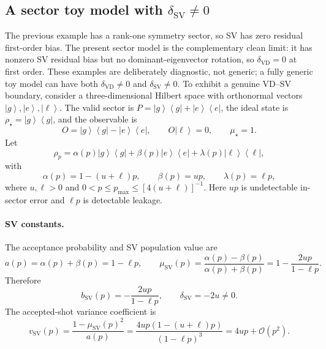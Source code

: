 \documentclass[11pt]{article}
\newcommand{\1}{\mathbf{1}}
\newcommand{\OO}{\mathcal{O}}
\newcommand{\bra}[1]{\left\langle #1\right|}
\newcommand{\ket}[1]{\left|#1\right\rangle}
\begin{document}
\subsection{A sector toy model with \texorpdfstring{$\delta_{\mathrm{SV}}\ne0$}{deltaSV nonzero}}
\label{subsec:sector_toy_delta_sv_nonzero_v5}
The previous example has a rank-one symmetry sector, so SV has zero residual first-order bias.  The present sector model is the complementary clean limit: it has nonzero SV residual bias but no dominant-eigenvector rotation, so \(\delta_{\mathrm{VD}}=0\) at first order.  These examples are deliberately diagnostic, not generic; a fully generic toy model can have both \(\delta_{\mathrm{VD}}\ne0\) and \(\delta_{\mathrm{SV}}\ne0\).  To exhibit a genuine VD--SV boundary, consider a three-dimensional Hilbert space with orthonormal vectors \(\ket g,\ket e,\ket\ell\).  The valid sector is \(P=\ket g\bra g+\ket e\bra e\), the ideal state is \(\rho_\star=\ket g\bra g\), and the observable is
\begin{equation}
    O=\ket g\bra g-\ket e\bra e,
    \qquad O\ket\ell=0,
    \qquad \mu_\star=1.
\end{equation}
Let
\begin{equation}
    \rho_p=\alpha(p)\ket g\bra g+\beta(p)\ket e\bra e+\lambda(p)\ket\ell\bra\ell,
    \label{eq:sector_toy_state_v5}
\end{equation}
with
\begin{equation}
    \alpha(p)=1-(u+\ell)p,
    \qquad
    \beta(p)=up,
    \qquad
    \lambda(p)=\ell p,
\end{equation}
where \(u,\ell>0\) and \(0<p\le p_{\max}\le[4(u+\ell)]^{-1}\).  Here \(up\) is undetectable in-sector error and \(\ell p\) is detectable leakage.

\paragraph{SV constants.}
The acceptance probability and SV population value are
\begin{equation}
    a(p)=\alpha(p)+\beta(p)=1-\ell p,
    \qquad
    \mu_{\mathrm{SV}}(p)=\frac{\alpha(p)-\beta(p)}{\alpha(p)+\beta(p)}
    =1-\frac{2up}{1-\ell p}.
\end{equation}
Therefore
\begin{equation}
    b_{\mathrm{SV}}(p)=-\frac{2up}{1-\ell p},
    \qquad
    \delta_{\mathrm{SV}}=-2u\ne0.
    \label{eq:sector_toy_delta_sv_v5}
\end{equation}
The accepted-shot variance coefficient is
\begin{equation}
    v_{\mathrm{SV}}(p)=\frac{1-\mu_{\mathrm{SV}}(p)^2}{a(p)}
    =\frac{4up(1-(u+\ell)p)}{(1-\ell p)^3}
    =4up+\OO(p^2).
    \label{eq:sector_toy_vsv_v5}
\end{equation}
\end{document}
